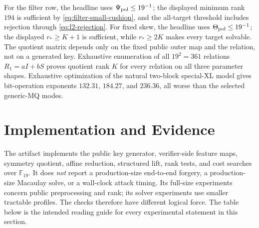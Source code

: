 \documentclass[11pt]{article}
\newcommand{\F}{\mathbb F}
\begin{document}
For the filter row, the headline uses $\Psi_{\rm pol}\le19^{-1}$; the
displayed minimum rank $194$ is sufficient by
\eqref{eq:filter-small-cushion}, and the all-target threshold includes
rejection through \eqref{eq:l2-rejection}.  For fixed skew, the headline uses $\Theta_{\rm pol}\le19^{-1}$; the
displayed $r_*\ge K+1$ is sufficient, while $r_*\ge2K$ makes every
target solvable.  The quotient matrix depends only on the
fixed public outer map and the relation, not on a generated key.  Exhaustive
enumeration of all $19^2=361$ relations $R_1=aI+bS$ proves quotient rank $K$
for every relation on all three parameter shapes.  Exhaustive optimization of
the natural two-block special-XL model gives bit-operation exponents $132.31$,
$184.27$, and $236.36$, all worse than the selected generic-MQ modes.

\section{Implementation and Evidence}\label{sec:evidence}

The artifact implements the public key generator, verifier-side feature maps,
symmetry quotient, affine reduction, structured lift, rank tests, and cost
searches over $\F_{19}$.  It does \emph{not} report a production-size
end-to-end forgery, a production-size Macaulay solve, or a wall-clock attack
timing.  Its full-size experiments concern public preprocessing and rank; its
solver experiments use smaller tractable profiles.  The checks therefore have
different logical force.  The table
below is the intended reading guide for every experimental statement in this
section.
\end{document}

